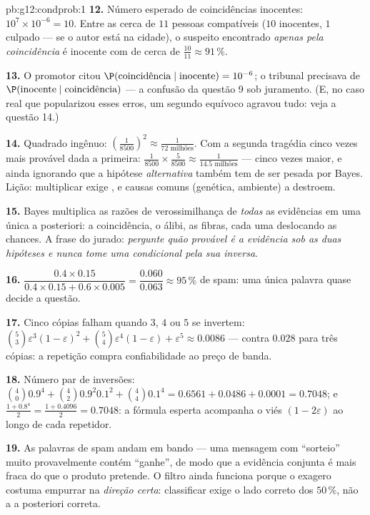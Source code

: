 \begin{solution}{pb:g12:condprob:1}
\textbf{12.} Número esperado de coincidências inocentes:
$10^7 \times 10^{-6} = 10$. Entre as cerca de $11$ pessoas
compatíveis ($10$ inocentes, $1$ culpado --- se o autor está
na cidade), o suspeito encontrado \emph{apenas pela
coincidência} é inocente com  de cerca de
$\frac{10}{11} \approx 91\,\%$.

\textbf{13.} O promotor citou
$\P(\text{coincidência} \mid \text{inocente}) = 10^{-6}$; o
tribunal precisava de
$\P(\text{inocente} \mid \text{coincidência})$ --- a confusão
da questão 9 sob juramento. (E, no caso real que popularizou
esses erros, um segundo equívoco agravou tudo: veja a questão
14.)

\textbf{14.} Quadrado ingênuo: $\left(\frac{1}{8500}\right)^2
\approx \frac{1}{72 \text{ milhões}}$. Com a segunda tragédia
cinco vezes mais provável dada a primeira:
$\frac{1}{8500} \times \frac{5}{8500} \approx
\frac{1}{14.5 \text{ milhões}}$ --- cinco vezes maior, e
ainda ignorando que a hipótese \emph{alternativa} também tem
de ser pesada por Bayes. Lição: multiplicar 
exige , e causas comuns (genética, ambiente) a
destroem.

\textbf{15.} Bayes multiplica as razões de verossimilhança de
\emph{todas} as evidências em uma única  a
posteriori: a coincidência, o álibi, as fibras, cada uma
deslocando as chances. A frase do jurado: \emph{pergunte
quão provável é a evidência sob as duas hipóteses e nunca
tome uma condicional pela sua inversa}.

\textbf{16.} $\dfrac{0.4 \times 0.15}{0.4 \times 0.15 +
0.6 \times 0.005} = \dfrac{0.060}{0.063} \approx 95\,\%$ de
spam: uma única palavra quase decide a questão.

\textbf{17.} Cinco cópias falham quando $3$, $4$ ou $5$ se
invertem:
$\binom53 \varepsilon^3(1-\varepsilon)^2 + \binom54
\varepsilon^4 (1 - \varepsilon) + \varepsilon^5 \approx
0.0086$ --- contra $0.028$ para três cópias: a repetição
compra confiabilidade ao preço de banda.

\textbf{18.} Número par de inversões:
$\binom40 0.9^4 + \binom42 0.9^2 0.1^2 + \binom44 0.1^4
= 0.6561 + 0.0486 + 0.0001 = 0.7048$; e
$\frac{1 + 0.8^4}{2} = \frac{1 + 0.4096}{2} = 0.7048$: a
fórmula esperta acompanha o viés $(1 - 2\varepsilon)$ ao
longo de cada repetidor.

\textbf{19.} As palavras de spam andam em bando --- uma
mensagem com ``sorteio'' muito provavelmente contém
``ganhe'', de modo que a evidência conjunta é mais fraca do
que o produto pretende. O filtro ainda funciona porque o
exagero costuma empurrar na \emph{direção certa}: classificar
exige o lado correto dos $50\,\%$, não a  a
posteriori correta.


\end{solution}
